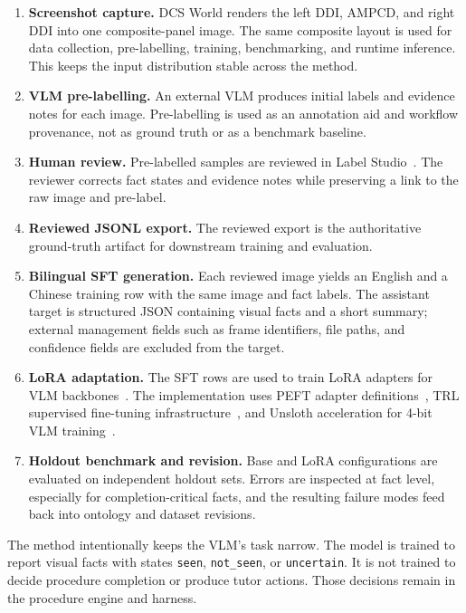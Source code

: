 \begin{enumerate}
\item \textbf{Screenshot capture.} DCS World renders the left DDI, AMPCD, and right
DDI into one composite-panel image. The same composite layout is used for data
collection, pre-labelling, training, benchmarking, and runtime inference. This
keeps the input distribution stable across the method.

\item \textbf{VLM pre-labelling.} An external VLM produces initial labels and
evidence notes for each image. Pre-labelling is used as an annotation aid and
workflow provenance, not as ground truth or as a benchmark baseline.

\item \textbf{Human review.} Pre-labelled samples are reviewed in Label
Studio~\citep{tkachenko2020labelstudio}. The reviewer corrects fact states and
evidence notes while preserving a link to the raw image and pre-label.

\item \textbf{Reviewed JSONL export.} The reviewed export is the authoritative
ground-truth artifact for downstream training and evaluation.

\item \textbf{Bilingual SFT generation.} Each reviewed image yields an English
and a Chinese training row with the same image and fact labels. The assistant
target is structured JSON containing visual facts and a short summary; external
management fields such as frame identifiers, file paths, and confidence fields
are excluded from the target.

\item \textbf{LoRA adaptation.} The SFT rows are used to train LoRA adapters
for VLM backbones~\citep{hu2021lora}. The implementation uses PEFT adapter
definitions~\citep{mangrulkar2022peft}, TRL supervised fine-tuning
infrastructure~\citep{vonwerra2020trl}, and Unsloth acceleration for 4-bit VLM
training~\citep{unsloth2024}.

\item \textbf{Holdout benchmark and revision.} Base and LoRA configurations are
evaluated on independent holdout sets. Errors are inspected at fact level,
especially for completion-critical facts, and the resulting failure modes feed
back into ontology and dataset revisions.
\end{enumerate}

The method intentionally keeps the VLM's task narrow. The model is trained to
report visual facts with states \texttt{seen}, \texttt{not\_seen}, or
\texttt{uncertain}. It is not trained to decide procedure completion or produce
tutor actions. Those decisions remain in the procedure engine and harness.

